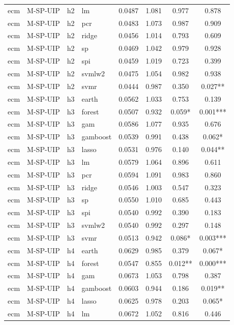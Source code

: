 \begin{ThreePartTable}
\begin{longtable}[t]{llclcccc}
ecm & M-SP-UIP & h2 & lm & 0.0487 & 1.081 & 0.977 & 0.878\\
ecm & M-SP-UIP & h2 & pcr & 0.0483 & 1.073 & 0.987 & 0.909\\
ecm & M-SP-UIP & h2 & ridge & 0.0456 & 1.014 & 0.793 & 0.609\\
ecm & M-SP-UIP & h2 & sp & 0.0469 & 1.042 & 0.979 & 0.928\\
ecm & M-SP-UIP & h2 & spi & 0.0459 & 1.019 & 0.723 & 0.399\\
ecm & M-SP-UIP & h2 & svmlw2 & 0.0475 & 1.054 & 0.982 & 0.938\\
ecm & M-SP-UIP & h2 & svmr & 0.0444 & 0.987 & 0.350 & 0.027**\\
\addlinespace
ecm & M-SP-UIP & h3 & earth & 0.0562 & 1.033 & 0.753 & 0.139\\
ecm & M-SP-UIP & h3 & forest & 0.0507 & 0.932 & 0.059* & 0.001***\\
ecm & M-SP-UIP & h3 & gam & 0.0586 & 1.077 & 0.935 & 0.676\\
ecm & M-SP-UIP & h3 & gamboost & 0.0539 & 0.991 & 0.438 & 0.062*\\
ecm & M-SP-UIP & h3 & lasso & 0.0531 & 0.976 & 0.140 & 0.044**\\
ecm & M-SP-UIP & h3 & lm & 0.0579 & 1.064 & 0.896 & 0.611\\
ecm & M-SP-UIP & h3 & pcr & 0.0594 & 1.091 & 0.983 & 0.860\\
ecm & M-SP-UIP & h3 & ridge & 0.0546 & 1.003 & 0.547 & 0.323\\
ecm & M-SP-UIP & h3 & sp & 0.0550 & 1.010 & 0.685 & 0.443\\
ecm & M-SP-UIP & h3 & spi & 0.0540 & 0.992 & 0.390 & 0.183\\
ecm & M-SP-UIP & h3 & svmlw2 & 0.0540 & 0.992 & 0.297 & 0.148\\
ecm & M-SP-UIP & h3 & svmr & 0.0513 & 0.942 & 0.086* & 0.003***\\
\addlinespace
ecm & M-SP-UIP & h4 & earth & 0.0629 & 0.985 & 0.379 & 0.067*\\
ecm & M-SP-UIP & h4 & forest & 0.0547 & 0.855 & 0.012** & 0.000***\\
ecm & M-SP-UIP & h4 & gam & 0.0673 & 1.053 & 0.798 & 0.387\\
ecm & M-SP-UIP & h4 & gamboost & 0.0603 & 0.944 & 0.186 & 0.019**\\
ecm & M-SP-UIP & h4 & lasso & 0.0625 & 0.978 & 0.203 & 0.065*\\
ecm & M-SP-UIP & h4 & lm & 0.0672 & 1.052 & 0.816 & 0.446\\

\end{longtable}
\end{ThreePartTable}
